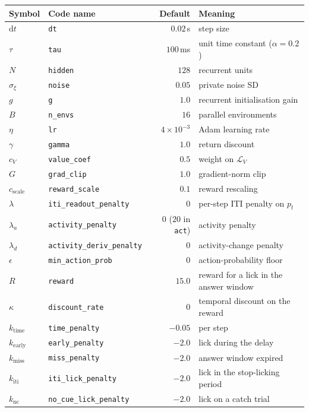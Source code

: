 \documentclass[11pt]{article}
\newcommand{\1}{\mathbf{1}}
\begin{document}
\begin{table}[h]\centering
\begin{tabular}{llrl}
\toprule
Symbol & Code name & Default & Meaning \\
\midrule
$\mathrm{d}t$ & \texttt{dt} & $0.02$\,s & step size \\
$\tau$ & \texttt{tau} & $100$\,ms & unit time constant ($\alpha = 0.2$) \\
$N$ & \texttt{hidden} & $128$ & recurrent units \\
$\sigma_{\!\xi}$ & \texttt{noise} & $0.05$ & private noise SD \\
$g$ & \texttt{g} & $1.0$ & recurrent initialisation gain \\
$B$ & \texttt{n\_envs} & $16$ & parallel environments \\
$\eta$ & \texttt{lr} & $4\times10^{-3}$ & Adam learning rate \\
$\gamma$ & \texttt{gamma} & $1.0$ & return discount \\
$c_V$ & \texttt{value\_coef} & $0.5$ & weight on $\mathcal{L}_V$ \\
$G$ & \texttt{grad\_clip} & $1.0$ & gradient-norm clip \\
$c_{\mathrm{scale}}$ & \texttt{reward\_scale} & $0.1$ & reward rescaling \\
$\lambda$ & \texttt{iti\_readout\_penalty} & $0$ & per-step ITI penalty on $p_t$ \\
$\lambda_a$ & \texttt{activity\_penalty} & $0$ ($20$ in \texttt{act}) & activity penalty \\
$\lambda_d$ & \texttt{activity\_deriv\_penalty} & $0$ & activity-change penalty \\
$\epsilon$ & \texttt{min\_action\_prob} & $0$ & action-probability floor \\
\midrule
$R$ & \texttt{reward} & $15.0$ & reward for a lick in the answer window \\
$\kappa$ & \texttt{discount\_rate} & $0$ & temporal discount on the reward \\
$k_{\mathrm{time}}$ & \texttt{time\_penalty} & $-0.05$ & per step \\
$k_{\mathrm{early}}$ & \texttt{early\_penalty} & $-2.0$ & lick during the delay \\
$k_{\mathrm{miss}}$ & \texttt{miss\_penalty} & $-2.0$ & answer window expired \\
$k_{\mathrm{iti}}$ & \texttt{iti\_lick\_penalty} & $-2.0$ & lick in the stop-licking period \\
$k_{\mathrm{nc}}$ & \texttt{no\_cue\_lick\_penalty} & $-2.0$ & lick on a catch trial \\

\end{tabular}
\end{table}
\end{document}
